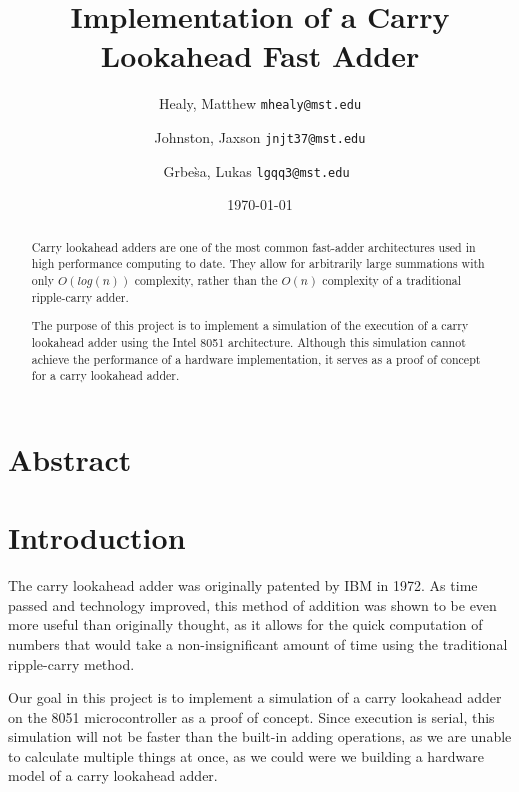 \documentclass{article}
\begin{document}
\title{Implementation of a Carry Lookahead Fast Adder}
\author{
	Healy, Matthew
	\texttt{mhealy@mst.edu}\\
	\and
	Johnston, Jaxson
	\texttt{jnjt37@mst.edu}\\
	\and
	Grbe\`sa, Lukas
	\texttt{lgqq3@mst.edu}\
}
\date{\today}

\maketitle

\pagebreak


\tableofcontents

\pagebreak

\section*{Abstract}
\begin{abstract}
Carry lookahead adders are one of the most common fast-adder architectures
used in high performance computing to date. They allow for arbitrarily large
summations with only $O(log(n))$ complexity, rather than the $O(n)$ complexity
of a traditional ripple-carry adder.

The purpose of this project is to implement a simulation of the execution
of a carry lookahead adder using the Intel 8051 architecture. Although this
simulation cannot achieve the performance of a hardware implementation, it
serves as a proof of concept for a carry lookahead adder.

\end{abstract}

\pagebreak

\section{Introduction}\label{sec:intro}
The carry lookahead adder was originally patented by IBM\cite{patent} in 1972.
As time passed and technology improved, this method of addition was shown
to be even more useful than originally thought, as it allows for the quick
computation of numbers that would take a non-insignificant amount of time
using the traditional ripple-carry method.

Our goal in this project is to implement a simulation of a carry lookahead
adder on the 8051 microcontroller as a proof of concept. Since execution is
serial, this simulation will not be faster than the built-in adding operations,
as we are unable to calculate multiple things at once, as we could were we
building a hardware model of a carry lookahead adder.
\end{document}
